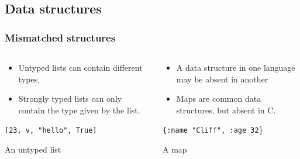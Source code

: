 \documentclass{beamer}
\newcommand{\linespace}{\vskip 0.25cm}
\begin{document}
\begin{frame}
\begin{columns}
\begin{column}{0.5\textwidth}
  \end{column}
  \end{columns}
\end{frame}

\subsection{Data structures}
\begin{frame}
  \frametitle{Mismatched structures}
  
  \begin{columns}
  \begin{column}{0.5\textwidth}
  \begin{itemize}
  	\item Untyped lists can contain different types,
  	\item Strongly typed lists can only contain the type given by the list.
  \end{itemize}
  
  {\tt [23, v, "hello", True]}
  
    An untyped list
    
  \end{column}
  
  \begin{column}{0.6\textwidth}

  
  \begin{itemize}
  \item A data structure in one language may be absent in another
  \item Maps are common data structures, but absent in C.
  \end{itemize}
  \linespace
  {\tt \{:name "Cliff", :age 32}\}
  
  A map
  \end{column}
  \end{columns}
\end{frame}
\end{document}
